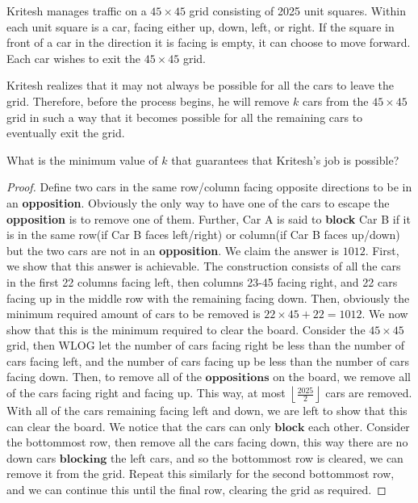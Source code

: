 \documentclass[11pt]{scrartcl}
\begin{document}
\begin{problem}
    Kritesh manages traffic on a $45 \times 45$ grid consisting of 2025 unit squares. Within each unit square is a car, facing either up, down,
    left, or right. If the square in front of a car in the direction it is facing is empty, it can choose to move forward. Each car wishes to exit
    the $45 \times 45$ grid.

    Kritesh realizes that it may not always be possible for all the cars to leave the grid. Therefore, before the process begins, he will 
    remove $k$ cars from the $45 \times 45$ grid in such a way that it becomes possible for all the remaining cars to eventually exit the grid.

    What is the minimum value of $k$ that guarantees that Kritesh's job is possible?
\end{problem}

\begin{proof}
    Define two cars in the same row/column facing opposite directions to be in an \textbf{opposition}. Obviously the only way to have one of the
    cars to escape the \textbf{opposition} is to remove one of them. Further, Car A is said to \textbf{block} Car B if it is in the same row(if
    Car B faces left/right) or column(if Car B faces up/down) but the two cars are not in an \textbf{opposition}.
    \newline \newline
    We claim the answer is $1012$. First, we show that this answer is achievable.
    \newline \newline
    The construction consists of all the cars in the first 22 columns facing left, then columns 23-45 facing right, and 22 cars facing up in the
    middle row with the remaining facing down. Then, obviously the minimum required amount of cars to be removed is $22\times45 + 22 = 1012$.
    \newline \newline
    We now show that this is the minimum required to clear the board. Consider the $45\times45$ grid, then WLOG let the number of cars facing
    right be less than the number of cars facing left, and the number of cars facing up be less than the number of cars facing down. Then, to
    remove all of the $\textbf{oppositions}$ on the board, we remove all of the cars facing right and facing up. This way, at most
    $\left\lfloor \frac{2025}{2} \right\rfloor$ cars are removed. With all of the cars remaining facing left and down, we are left to show that
    this can clear the board. We notice that the cars can only $\textbf{block}$ each other. Consider the bottommost row, then remove all the cars
    facing down, this way there are no down cars $\textbf{blocking}$ the left cars, and so the bottommost row is cleared, we can remove it from the
    grid. Repeat this similarly for the second bottommost row, and we can continue this until the final row, clearing the grid as required.
\end{proof}
\end{document}
